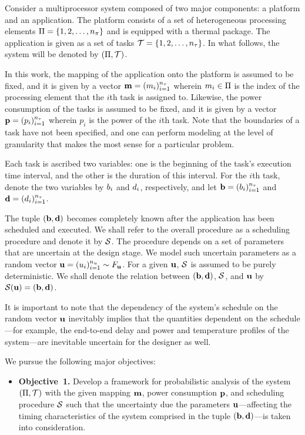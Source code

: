 Consider a multiprocessor system composed of two major components: a platform
and an application. The platform consists of a set of heterogeneous processing
elements $\Pi = \{ 1, 2, \dots, {n_\pi} \}$ and is equipped with a thermal
package. The application is given as a set of tasks $\mathcal{T} = \{ 1, 2, \dots,
{n_\tau} \}$. In what follows, the system will be denoted by $(\Pi, \mathcal{T})$.

In this work, the mapping of the application onto the platform is assumed to be
fixed, and it is given by a vector $\mathbf{m} = (m_i)_{i = 1}^{{n_\tau}}$ wherein $m_i
\in \Pi$ is the index of the processing element that the $i$th task is
assigned to. Likewise, the power consumption of the tasks is assumed to be
fixed, and it is given by a vector $\mathbf{p} = (p_i)_{i = 1}^{{n_\tau}}$ wherein $p_i$
is the power of the $i$th task. Note that the boundaries of a task have not been
specified, and one can perform modeling at the level of granularity that makes
the most sense for a particular problem.

Each task is ascribed two variables: one is the beginning of the task's
execution time interval, and the other is the duration of this interval. For the
$i$th task, denote the two variables by $b_i$ and $d_i$, respectively, and let
$\mathbf{b} = (b_i)_{i=1}^{{n_\tau}}$ and $\mathbf{d} = (d_i)_{i=1}^{{n_\tau}}$.

The tuple $(\mathbf{b}, \mathbf{d})$ becomes completely known after the application has been
scheduled and executed. We shall refer to the overall procedure as a scheduling
procedure and denote it by $\mathcal{S}$. The procedure depends on a set of
parameters that are uncertain at the design stage. We model such uncertain
parameters as a random vector $\mathbf{u} = (u_i)_{i = 1}^{n_u} \sim F_{\mathbf{u}}$.
For a given $\mathbf{u}$, $\mathcal{S}$ is assumed to be purely deterministic. We shall
denote the relation between $(\mathbf{b}, \mathbf{d})$, $\mathcal{S}$, and $\mathbf{u}$ by
$\mathcal{S}(\mathbf{u}) = (\mathbf{b}, \mathbf{d})$.

It is important to note that the dependency of the system's schedule on the
random vector $\mathbf{u}$ inevitably implies that the quantities dependent on the
schedule---for example, the end-to-end delay and power and temperature profiles
of the system---are inevitable uncertain for the designer as well.

We pursue the following major objectives:
\begin{itemize}

\item \textbf{Objective~1.} Develop a framework for probabilistic analysis of
  the system $(\Pi, \mathcal{T})$ with the given mapping $\mathbf{m}$, power
  consumption $\mathbf{p}$, and scheduling procedure $\mathcal{S}$ such that the
  uncertainty due the parameters $\mathbf{u}$---affecting the timing characteristics of
  the system comprised in the tuple $(\mathbf{b}, \mathbf{d})$---is taken into consideration.

\end{itemize}

